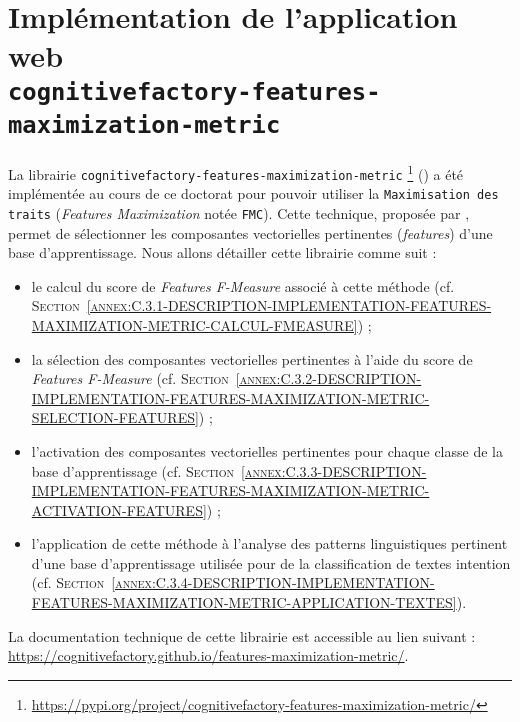 \section[
		\texttt{cognitivefactory-features-maximization-metric}
	]{
		Implémentation de l'application web \\ \texttt{cognitivefactory-features-maximization-metric}
	}
\label{annex:C.3-DESCRIPTION-IMPLEMENTATION-FEATURES-MAXIMIZATION-METRIC}
	
	La librairie \texttt{cognitivefactory-features-maximization-metric} \footnote{
		\url{https://pypi.org/project/cognitivefactory-features-maximization-metric/}
	} (\cite{schild:2023:cognitivefactory-featuresmaximizationmetric}) a été implémentée au cours de ce doctorat pour pouvoir utiliser la \texttt{Maximisation des traits} (\textit{Features Maximization} notée \texttt{FMC}).
	Cette technique, proposée par \cite{lamirel-etal:2017:novel-approach-feature}, permet de sélectionner les composantes vectorielles pertinentes (\textit{features}) d'une base d'apprentissage.
	Nous allons détailler cette librairie comme suit :
	\begin{itemize}
		\item le calcul du score de \textit{Features F-Measure} associé à cette méthode (cf. \textsc{Section~\ref{annex:C.3.1-DESCRIPTION-IMPLEMENTATION-FEATURES-MAXIMIZATION-METRIC-CALCUL-FMEASURE}}) ;
		\item la sélection des composantes vectorielles pertinentes à l'aide du score de \textit{Features F-Measure} (cf. \textsc{Section~\ref{annex:C.3.2-DESCRIPTION-IMPLEMENTATION-FEATURES-MAXIMIZATION-METRIC-SELECTION-FEATURES}}) ;
		\item l'activation des composantes vectorielles pertinentes pour chaque classe de la base d'apprentissage (cf. \textsc{Section~\ref{annex:C.3.3-DESCRIPTION-IMPLEMENTATION-FEATURES-MAXIMIZATION-METRIC-ACTIVATION-FEATURES}}) ;
		\item l'application de cette méthode à l'analyse des patterns linguistiques pertinent d'une base d'apprentissage utilisée pour de la classification de textes intention (cf. \textsc{Section~\ref{annex:C.3.4-DESCRIPTION-IMPLEMENTATION-FEATURES-MAXIMIZATION-METRIC-APPLICATION-TEXTES}}).
	\end{itemize}
	
	\begin{leftBarInformation}
		La documentation technique de cette librairie est accessible au lien suivant : \url{https://cognitivefactory.github.io/features-maximization-metric/}.
	\end{leftBarInformation}
	
